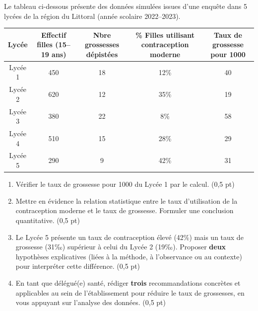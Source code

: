\documentclass[11pt]{article}
\begin{document}
\begin{exercice}
Le tableau ci-dessous présente des données simulées issues d'une enquête dans 5 lycées de la région du Littoral (année scolaire 2022--2023).

\begin{center}
\begin{tabular}{|c|c|c|c|c|}
\hline
\textbf{Lycée} & \textbf{Effectif filles (15--19 ans)} & \textbf{Nbre grossesses dépistées} & \textbf{\% Filles utilisant contraception moderne} & \textbf{Taux de grossesse pour 1000} \\ \hline
Lycée 1 & 450 & 18 & 12\% & 40 \\ \hline
Lycée 2 & 620 & 12 & 35\% & 19 \\ \hline
Lycée 3 & 380 & 22 & 8\% & 58 \\ \hline
Lycée 4 & 510 & 15 & 28\% & 29 \\ \hline
Lycée 5 & 290 & 9 & 42\% & 31 \\ \hline
\end{tabular}
\end{center}

\begin{enumerate}
    \item Vérifier le taux de grossesse pour 1000 du Lycée 1 par le calcul. (0,5 pt)
    \item Mettre en évidence la relation statistique entre le taux d'utilisation de la contraception moderne et le taux de grossesse. Formuler une conclusion quantitative. (0,5 pt)
    \item Le Lycée 5 présente un taux de contraception élevé (42\%) mais un taux de grossesse (31‰) supérieur à celui du Lycée 2 (19‰). Proposer \textbf{deux} hypothèses explicatives (liées à la méthode, à l'observance ou au contexte) pour interpréter cette différence. (0,5 pt)
    \item En tant que délégué(e) santé, rédiger \textbf{trois} recommandations concrètes et applicables au sein de l'établissement pour réduire le taux de grossesses, en vous appuyant sur l'analyse des données. (0,5 pt)
\end{enumerate}
\end{exercice}
\end{document}
